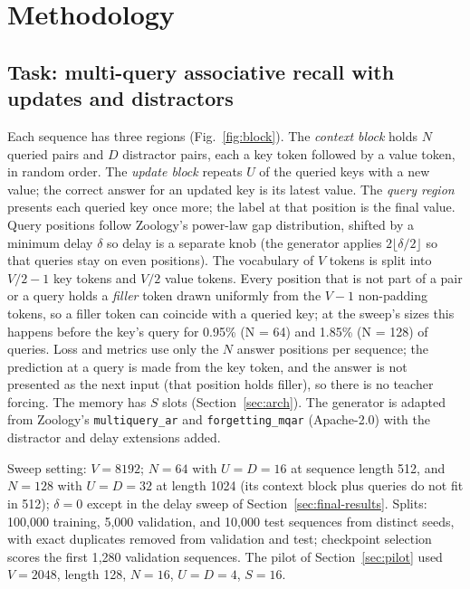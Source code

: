 \documentclass[conference]{IEEEtran}
\begin{document}
\section{Methodology}
\label{sec:method}

\subsection{Task: multi-query associative recall with updates and distractors}
\label{sec:task}

Each sequence has three regions (Fig.~\ref{fig:block}). The \emph{context
block} holds $N$ queried pairs and $D$ distractor pairs, each a key token
followed by a value token, in random order. The \emph{update block} repeats $U$
of the queried keys with a new value; the correct answer for an updated key is
its latest value. The \emph{query region} presents each queried key once more;
the label at that position is the final value. Query positions follow Zoology's
power-law gap distribution, shifted by a minimum delay $\delta$ so delay is a
separate knob (the generator applies $2\lfloor\delta/2\rfloor$ so that queries
stay on even positions). The vocabulary of $V$ tokens is split into $V/2 - 1$
key tokens and $V/2$ value tokens. Every position that is not part of a pair or
a query holds a \emph{filler} token drawn uniformly from the $V - 1$
non-padding tokens, so a filler token can coincide with a queried key; at the
sweep's sizes this happens before the key's query for 0.95\% (N = 64) and
1.85\% (N = 128) of queries. Loss and metrics use only the $N$ answer
positions per sequence; the prediction at a query is made from the key token,
and the answer is not presented as the next input (that position holds
filler), so there is no teacher forcing. The memory has $S$ slots
(Section~\ref{sec:arch}). The generator is adapted from
Zoology's \texttt{multiquery\_ar} and \texttt{forgetting\_mqar} (Apache-2.0)
with the distractor and delay extensions added.

Sweep setting: $V = 8192$; $N = 64$ with $U = D = 16$ at sequence length 512,
and $N = 128$ with $U = D = 32$ at length 1024 (its context block plus queries
do not fit in 512); $\delta = 0$ except in the delay sweep of
Section~\ref{sec:final-results}. Splits: 100{,}000 training, 5{,}000
validation, and 10{,}000 test sequences from distinct seeds, with exact
duplicates removed from validation and test; checkpoint selection scores the
first 1{,}280 validation sequences. The pilot of Section~\ref{sec:pilot} used
$V = 2048$, length 128, $N = 16$, $U = D = 4$, $S = 16$.
\end{document}
